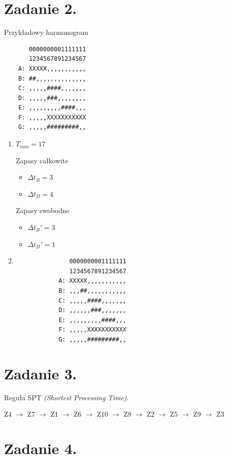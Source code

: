 \documentclass{article}
\begin{document}
\pagebreak
\section*{Zadanie 2.}

Przykładowy harmonogram
\begin{verbatim}
       0000000001111111
       1234567891234567
    A: XXXXX,,,,,,,,,,,
    B: ##,,,,,,,,,,,,,,
    C: ,,,,,####,,,,,,,
    D: ,,,,,###,,,,,,,,
    E: ,,,,,,,,,####,,,
    F: ,,,,,XXXXXXXXXXX
    G: ,,,,,#########,,
\end{verbatim}

\begin{enumerate}[label=\alph*)]
    \item $T_{min}= 17$

          Zapasy całkowite
          \begin{itemize}
              \item $\Delta t_B = 3$
              \item $\Delta t_D = 4$
          \end{itemize}

          Zapasy swobodne
          \begin{itemize}
              \item $\Delta t_B' = 3$
              \item $\Delta t_D' = 1$
          \end{itemize}
    \item
          \begin{verbatim}
               0000000001111111
               1234567891234567
            A: XXXXX,,,,,,,,,,,
            B: ,,,##,,,,,,,,,,,
            C: ,,,,,####,,,,,,,
            D: ,,,,,,###,,,,,,,
            E: ,,,,,,,,,####,,,
            F: ,,,,,XXXXXXXXXXX
            G: ,,,,,#########,,
           \end{verbatim}
\end{enumerate}

\section*{Zadanie 3.}
Reguła SPT \emph{(Shortest Processing Time)}.

Z4 $\rightarrow$
Z7 $\rightarrow$
Z1 $\rightarrow$
Z6 $\rightarrow$
Z10 $\rightarrow$
Z8 $\rightarrow$
Z2 $\rightarrow$
Z5 $\rightarrow$
Z9 $\rightarrow$
Z3

\section*{Zadanie 4.}
\end{document}
